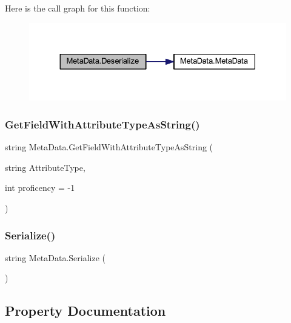 Here is the call graph for this function\+:
\nopagebreak
\begin{figure}[H]
\begin{center}
\leavevmode
\includegraphics[width=330pt]{class_meta_data_adcfb4cc074566933e35c3f14451960ed_cgraph}
\end{center}
\end{figure}
\mbox{\label{class_meta_data_a6060e6297723e54b0df6c20defb57297}} 
\subsubsection{\texorpdfstring{Get\+Field\+With\+Attribute\+Type\+As\+String()}{GetFieldWithAttributeTypeAsString()}}
{\footnotesize\ttfamily string Meta\+Data.\+Get\+Field\+With\+Attribute\+Type\+As\+String (\begin{DoxyParamCaption}\item[{string}]{Attribute\+Type,  }\item[{int}]{proficency = {\ttfamily -\/1} }\end{DoxyParamCaption})}

\mbox{\label{class_meta_data_ad61836ec0caf65061ecdcd16c0ee6109}} 
\subsubsection{\texorpdfstring{Serialize()}{Serialize()}}
{\footnotesize\ttfamily string Meta\+Data.\+Serialize (\begin{DoxyParamCaption}{ }\end{DoxyParamCaption})}



\subsection{Property Documentation}
\mbox{\label{class_meta_data_a1cdef15bd6753836cd2baa6533ebc306}} 
